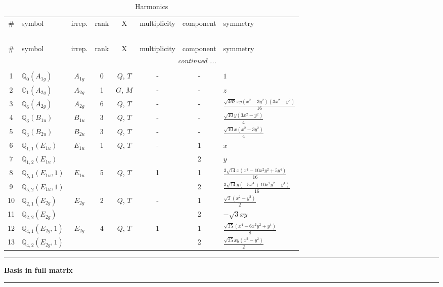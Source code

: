 \documentclass[fleqn,10pt,landscape]{jsarticle}
\begin{document}
\renewcommand{\arraystretch}{1.6}
\begin{longtable}[l]{clcccccl}
\captionsetup{justification=raggedright, singlelinecheck=off}
\caption{Harmonics}
 \\
 \hline \hline
\# & symbol & irrep. & rank & X & multiplicity & component & symmetry \\ \hline \endfirsthead

\multicolumn{7}{l}{\tablename\ \thetable{}} \\
 \hline \hline
\# & symbol & irrep. & rank & X & multiplicity & component & symmetry \\ \hline \endhead

 \hline \hline
\multicolumn{7}{r}{\footnotesize\it continued ...} \\ \endfoot

 \hline \hline
\multicolumn{7}{r}{} \\ \endlastfoot

1 & $\mathbb{Q}_{0}(A_{1g})$ & $A_{1g}$ & 0 & $Q$, $T$ & - & - & $1$ \\ \hline
2 & $\mathbb{G}_{1}(A_{2g})$ & $A_{2g}$ & 1 & $G$, $M$ & - & - & $z$ \\ \hline
3 & $\mathbb{Q}_{6}(A_{2g})$ & $A_{2g}$ & 6 & $Q$, $T$ & - & - & $\frac{\sqrt{462} x y \left(x^{2} - 3 y^{2}\right) \left(3 x^{2} - y^{2}\right)}{16}$ \\ \hline
4 & $\mathbb{Q}_{3}(B_{1u})$ & $B_{1u}$ & 3 & $Q$, $T$ & - & - & $\frac{\sqrt{10} y \left(3 x^{2} - y^{2}\right)}{4}$ \\ \hline
5 & $\mathbb{Q}_{3}(B_{2u})$ & $B_{2u}$ & 3 & $Q$, $T$ & - & - & $\frac{\sqrt{10} x \left(x^{2} - 3 y^{2}\right)}{4}$ \\ \hline
6 & $\mathbb{Q}_{1,1}(E_{1u})$ & $E_{1u}$ & 1 & $Q$, $T$ & - & 1 & $x$ \\
7 & $\mathbb{Q}_{1,2}(E_{1u})$ &  &  &  &  & 2 & $y$ \\ \hline
8 & $\mathbb{Q}_{5,1}(E_{1u},1)$ & $E_{1u}$ & 5 & $Q$, $T$ & 1 & 1 & $\frac{3 \sqrt{14} x \left(x^{4} - 10 x^{2} y^{2} + 5 y^{4}\right)}{16}$ \\
9 & $\mathbb{Q}_{5,2}(E_{1u},1)$ &  &  &  &  & 2 & $\frac{3 \sqrt{14} y \left(- 5 x^{4} + 10 x^{2} y^{2} - y^{4}\right)}{16}$ \\ \hline
10 & $\mathbb{Q}_{2,1}(E_{2g})$ & $E_{2g}$ & 2 & $Q$, $T$ & - & 1 & $\frac{\sqrt{3} \left(x^{2} - y^{2}\right)}{2}$ \\
11 & $\mathbb{Q}_{2,2}(E_{2g})$ &  &  &  &  & 2 & $- \sqrt{3} x y$ \\ \hline
12 & $\mathbb{Q}_{4,1}(E_{2g},1)$ & $E_{2g}$ & 4 & $Q$, $T$ & 1 & 1 & $\frac{\sqrt{35} \left(x^{4} - 6 x^{2} y^{2} + y^{4}\right)}{8}$ \\
13 & $\mathbb{Q}_{4,2}(E_{2g},1)$ &  &  &  &  & 2 & $\frac{\sqrt{35} x y \left(x^{2} - y^{2}\right)}{2}$ \\
\end{longtable}
\vspace{5mm}
\noindent \rule[0.5mm]{5mm}{0.5mm}\hspace{3mm}\textbf{Basis in full matrix}\hspace{3mm}\leaders\hrule height 0.5mm\hfill\kern0pt
\vspace{3mm}
\end{document}
